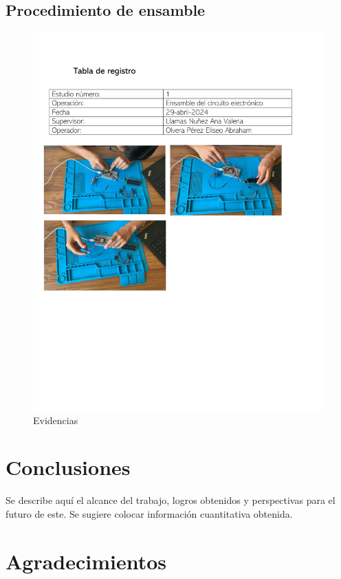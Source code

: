     \subsection{Procedimiento de ensamble}
    \begin{figure}[H]
        \centering
        \includegraphics[trim = {12mm 60mm 12mm 40mm},clip,scale=0.5]{16/Img/TablaDeRegistro.pdf}
        \caption{Evidencias}
        \label{fig:Evidencias}
    \end{figure}
   
    
    \section{Conclusiones}
    
    Se describe aquí el alcance del trabajo, logros obtenidos y perspectivas para el futuro de este. Se sugiere colocar información cuantitativa obtenida.
    
    \section{Agradecimientos}
    
